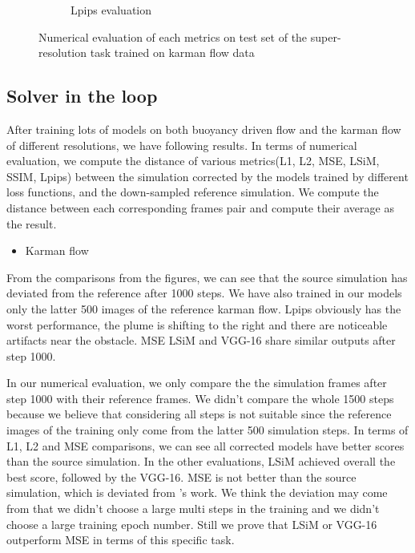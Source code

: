\documentclass[a4paper,12pt,twoside]{report}
\begin{document}
\begin{figure}
\begin{subfigure}{0.32\textwidth}
		\caption{Lpips evaluation}
	\end{subfigure}
	\caption{Numerical evaluation of each metrics on test set of the super-resolution task trained on karman flow data}
\end{figure}

\subsection{Solver in the loop}
After training lots of models on both buoyancy driven flow and the karman flow of different resolutions, we have following results. In terms of numerical evaluation, we compute the distance of various metrics(L1, L2, MSE, LSiM, SSIM, Lpips) between the simulation corrected by the models trained by different loss functions, and the down-sampled reference simulation. We compute the distance between each corresponding frames pair and compute their average as the result.
\begin{itemize}
  \item Karman flow
\end{itemize}
From the comparisons from the figures, we can see that the source simulation has deviated from the reference after 1000 steps. We have also trained in our models only the latter 500 images of the reference karman flow. Lpips obviously has the worst performance, the plume is shifting to the right and there are noticeable artifacts near the obstacle. MSE LSiM and VGG-16 share similar outputs after step 1000.

In our numerical evaluation, we only compare the the simulation frames after step 1000 with their reference frames. We didn't compare the whole 1500 steps because we believe that considering all steps is not suitable since the reference images of the training only come from the latter 500 simulation steps. In terms of L1, L2 and MSE comparisons, we can see all corrected models have better scores than the source simulation. In the other evaluations, LSiM achieved overall the best score, followed by the VGG-16. MSE is not better than the source simulation, which is deviated from \citeauthor{um2020sol}'s work. We think the deviation may come from that we didn't choose a large multi steps in the training and we didn't choose a large training epoch number. Still we prove that LSiM or VGG-16 outperform MSE in terms of this specific task.
\end{document}
